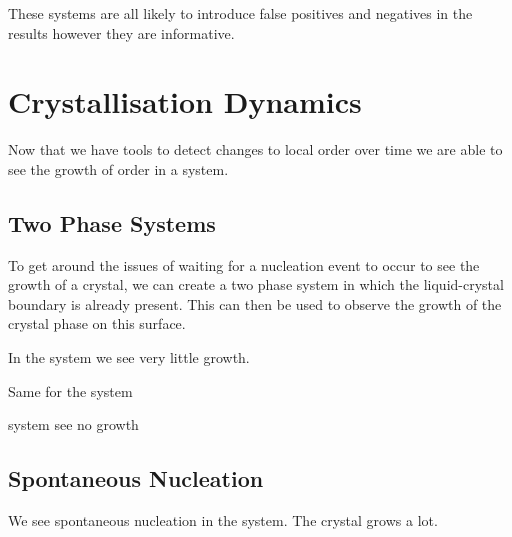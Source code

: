 These systems are all likely to introduce false positives and negatives in the results however they are informative.

\section{Crystallisation Dynamics}


Now that we have tools to detect changes to local order over time we are able to see the growth of order in a system.

\subsection{Two Phase Systems}

To get around the issues of waiting for a nucleation event to occur to see the growth of a crystal, we can create a two phase system in which the liquid-crystal boundary is already present. This can then be used to observe the growth of the crystal phase on this surface. 

In the \sone system we see very little growth.

Same for the \scon system

\tri system see no growth

\subsection{Spontaneous Nucleation}

We see spontaneous nucleation in the \sone system. The crystal grows a lot.
